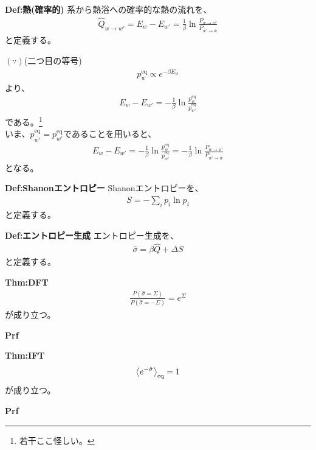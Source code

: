 \documentclass[a4paper,11pt]{jsarticle}
\numberwithin{equation}{section}
\begin{document}
\begin{itembox}[l]{\textbf{Def:熱(確率的)}}
    系から熱浴への確率的な熱の流れを、
    \begin{align}
        \hat{Q}_{w\to w'} = E_{w} - E_{w'} =\frac{1}{\beta}\ln \frac{P_{w\to w'}}{P_{\bar{w'}\to \bar{w}}}
    \end{align}
    と定義する。

\end{itembox}
$(\because)$(二つ目の等号)\\
\begin{align*}
    p_{w}^{\text{eq}} \propto e^{-\beta E_{w}}
\end{align*}
より、
\begin{align*}
    E_{w} - E_{w'} = -\frac{1}{\beta}\ln \frac{p_{w}^{\text{eq}}}{p_{w'}^{\text{eq}}}
\end{align*}
である。\footnote{若干ここ怪しい。}\\
いま、$p_{\bar{w'}}^{\text{eq}} = p_{w'}^{\text{eq}}$であることを用いると、
\begin{align*}
    E_{w} - E_{w'} = -\frac{1}{\beta}\ln \frac{p_{w}^{\text{eq}}}{p_{w'}^{\text{eq}}} = -\frac{1}{\beta}\ln \frac{P_{w\to w'}}{P_{\bar{w'}\to \bar{w}}}
\end{align*}
となる。\hfill\qedsymbol\\

\begin{itembox}[l]{\textbf{Def:Shanonエントロピー}}
    Shanonエントロピーを、
    \begin{align}
        S = -\sum_{i}p_{i}\ln p_{i}
    \end{align}
    と定義する。

\end{itembox}

\begin{itembox}[l]{\textbf{Def:エントロピー生成}}
    エントロピー生成を、
    \begin{align}
        \hat{\sigma} = \beta \hat{Q} + \Delta S
    \end{align}
    と定義する。

\end{itembox}

\begin{itembox}[l]{\textbf{Thm:DFT}}
    \begin{align}
        \frac{P(\hat{\sigma} = \Sigma)}{P(\hat{\sigma} = -\Sigma)} = e^{\Sigma}
    \end{align}
    が成り立つ。
\end{itembox}
\textbf{Prf}\\

\begin{itembox}[l]{\textbf{Thm:IFT}}
    \begin{align}
        \ev{e^{-\hat{\sigma}}}_{\text{eq}} = 1
    \end{align}
    が成り立つ。
\end{itembox}
\textbf{Prf}\\
\end{document}

